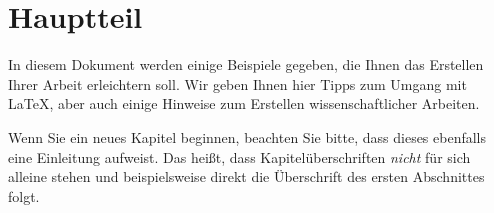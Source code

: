 \chapter{Hauptteil}
\label{cha:Einleitung}

In diesem Dokument werden einige Beispiele gegeben, die Ihnen das Erstellen Ihrer Arbeit erleichtern soll. Wir geben Ihnen hier Tipps zum Umgang mit \LaTeX, aber auch einige Hinweise zum Erstellen wissenschaftlicher Arbeiten. 

Wenn Sie ein neues Kapitel beginnen, beachten Sie bitte, dass dieses ebenfalls eine Einleitung aufweist. Das heißt, dass Kapitelüberschriften \textit{nicht} für sich alleine stehen und beispielsweise direkt die Überschrift des ersten Abschnittes folgt.